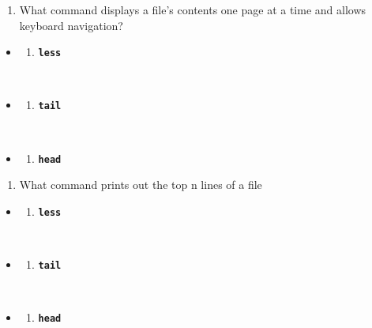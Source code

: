 \documentclass[
  letterpaper,
  DIV=11,
  numbers=noendperiod]{scrreprt}
\providecommand{\tightlist}{%
  \setlength{\itemsep}{0pt}\setlength{\parskip}{0pt}}\usepackage{longtable,booktabs,array}
\begin{document}
\begin{enumerate}
\def\labelenumi{\arabic{enumi}.}
\setcounter{enumi}{3}
\tightlist
\item
  What command displays a file's contents one page at a time and allows
  keyboard navigation?
\end{enumerate}

\begin{itemize}
\item
  \begin{enumerate}
  \def\labelenumi{(\Alph{enumi})}
  \tightlist
  \item
    \textbf{\texttt{less}}\strut \\
  \end{enumerate}
\item
  \begin{enumerate}
  \def\labelenumi{(\Alph{enumi})}
  \setcounter{enumi}{1}
  \tightlist
  \item
    \textbf{\texttt{tail}}\strut \\
  \end{enumerate}
\item
  \begin{enumerate}
  \def\labelenumi{(\Alph{enumi})}
  \setcounter{enumi}{2}
  \tightlist
  \item
    \textbf{\texttt{head}}
  \end{enumerate}
\end{itemize}

\begin{enumerate}
\def\labelenumi{\arabic{enumi}.}
\setcounter{enumi}{4}
\tightlist
\item
  What command prints out the top n lines of a file
\end{enumerate}

\begin{itemize}
\item
  \begin{enumerate}
  \def\labelenumi{(\Alph{enumi})}
  \tightlist
  \item
    \textbf{\texttt{less}}\strut \\
  \end{enumerate}
\item
  \begin{enumerate}
  \def\labelenumi{(\Alph{enumi})}
  \setcounter{enumi}{1}
  \tightlist
  \item
    \textbf{\texttt{tail}}\strut \\
  \end{enumerate}
\item
  \begin{enumerate}
  \def\labelenumi{(\Alph{enumi})}
  \setcounter{enumi}{2}
  \tightlist
  \item
    \textbf{\texttt{head}}
  \end{enumerate}
\end{itemize}
\end{document}
